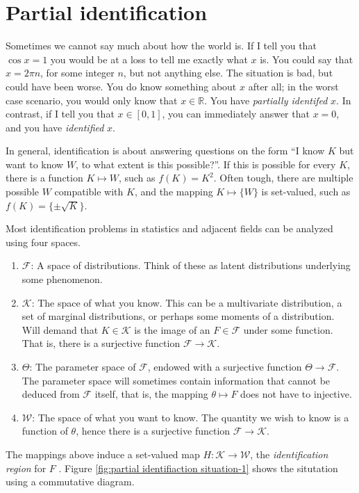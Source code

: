 \section{Partial identification}

Sometimes we cannot say much about how the world is. If I tell
you that $\cos x=1$ you would be at a loss to tell me exactly what
$x$ is. You could say that $x=2\pi n$, for some integer $n$, but
not anything else. The situation is bad, but could have been worse.
You do know something about $x$ after all; in the worst case scenario,
you would only know that $x\in\mathbb{R}$. You have \emph{partially
identifed} $x$. In contrast, if I tell you that $x\in[0,1]$, you
can immediately answer that $x=0$, and you have \emph{identified}
$x$.

In general, identification is about answering questions on the form
``I know $K$ but want to know $W$, to what extent is this possible?''.
If this is possible for every $K$, there is a function $K\mapsto W$,
such as $f(K)=K^{2}$. Often tough, there are multiple possible $W$
compatible with $K$, and the mapping $K\mapsto\{W\}$ is set-valued,
such as $f(K)=\{\pm\sqrt{K}\}$.

Most identification problems in statistics and adjacent fields can
be analyzed using four spaces.
\begin{enumerate}
\item $\mathcal{F}$: A space of distributions. Think of these as latent
distributions underlying some phenomenon. 
\item $\mathcal{K}$: The space of what you know. This can be a multivariate
distribution, a set of marginal distributions, or perhaps some moments
of a distribution. Will demand that $K\in\mathcal{K}$ is the image
of an $F\in\mathcal{F}$ under some function. That is, there is a
surjective function $\mathcal{F}\to\mathcal{K}$. 
\item $\Theta$: The parameter space of $\mathcal{F}$,
endowed with a surjective function $\Theta\to\mathcal{F}$. The parameter
space will sometimes contain information that cannot be deduced from
$\mathcal{F}$ itself, that is, the mapping $\theta\mapsto F$ does
not have to injective. 
\item $\mathcal{W}$: The space of what you want to know. The quantity we wish to know is a function of $\theta$, hence there is a surjective
function $\mathcal{F}\to\mathcal{K}$. 
\end{enumerate}
The mappings above induce a set-valued map $H:\mathcal{K}\to\mathcal{W}$,
the\emph{ identification region} for $F$ \parencite{Manski2003-aq}.
Figure \ref{fig:partial identifiaction situation-1} shows the situtation
using a commutative diagram. 

